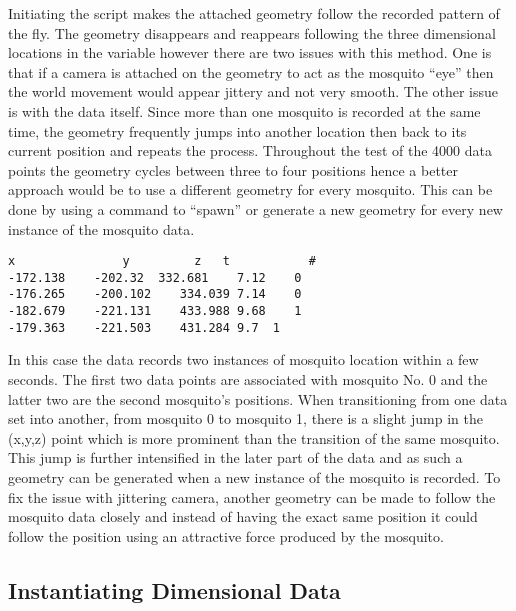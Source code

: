  Initiating the script makes the attached geometry follow the recorded pattern of the fly. The geometry disappears and reappears following the three dimensional locations in the variable  however there are two issues with this method. One is that if a camera is attached on the geometry to act as the mosquito ``eye'' then the world movement would appear jittery and not very smooth. The other issue is with the data itself. Since more than one mosquito is recorded at the same time, the geometry frequently jumps into another location then back to its current position and repeats the process. Throughout the test of the 4000 data points the geometry cycles between three to four positions hence a better approach would be to use a different geometry for every mosquito. This can be done by using a command to ``spawn'' or generate a new geometry for every new instance of the mosquito data.
 
\bigskip
\begin{code1}
\begin{verbatim}
x	            y	      z	  t           #
-172.138	-202.32	 332.681	7.12	0
-176.265	-200.102	334.039	7.14	0
-182.679	-221.131	433.988	9.68	1
-179.363	-221.503	431.284	9.7	 1
\end{verbatim}
\label{code:TwoFly}
\end{code1}

In this case the data records two instances of mosquito location within a few seconds. The first two data points are associated with mosquito No. 0 and the latter two are the second mosquito's positions. When transitioning from one data set into another, from mosquito 0 to mosquito 1, there is a slight jump in the (x,y,z) point which is more prominent than the transition of the same mosquito. This jump is further intensified in the later part of the data and as such a geometry can be generated when a new instance of the mosquito is recorded. To fix the issue with jittering camera, another geometry can be made to follow the mosquito data closely and instead of having the exact same position it could follow the position using an attractive force produced by the mosquito.

\subsection{Instantiating Dimensional Data}

